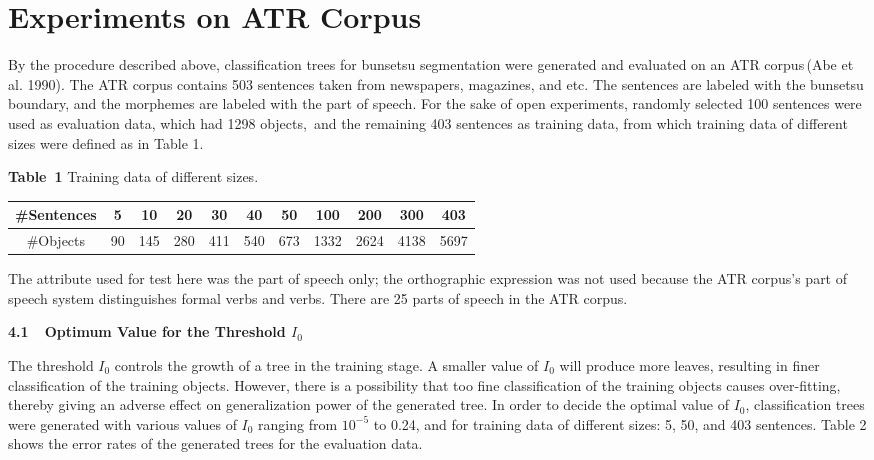 \section{Experiments on  ATR Corpus}
By the procedure described above, classification trees
for bunsetsu segmentation  were generated and  evaluated 
on an ATR corpus\,(Abe et al. 1990).
The ATR corpus contains 503 sentences taken from
newspapers, magazines, and etc. The sentences 
are  labeled with the bunsetsu boundary, and the morphemes are labeled with 
the part of speech.
For the sake  of open experiments,  randomly selected 100 sentences  were
used  as  evaluation data, which  had 1298 objects,\ and the remaining
403 sentences as  training data, from which training data of different sizes
 were  defined as in Table 1.
\begin{center}
{\bf Table\ 1} Training data of different sizes.
\vspace{10pt}\\
\begin{tabular}{c|c|c|c|c|c|c|c|c|c|c}
\#Sentences&5&10&20&30&40&50&100&200&300&403\\ \hline
\#Objects& 90 &145&280 &411   &540   &673   & 1332 &2624   &4138   &5697 
\end{tabular}
\end{center}
The attribute used for test here was the part of speech only; 
the orthographic expression
was not used because the ATR corpus's part of speech system
distinguishes formal verbs and verbs. There are 25 parts of speech in the ATR corpus.
\begin{flushleft}
{\large \bf 4.1\ \ Optimum Value for the Threshold  $I_0$ }
\end{flushleft}
  The threshold $I_0$ controls the growth of a tree in the training
stage.
A smaller value of $I_0$ will produce more leaves, resulting in 
finer classification of the training objects. However, there is a
possibility
that too fine classification of the training objects causes over-fitting,
thereby giving an adverse effect on generalization power  of the
generated tree.
In order to decide the optimal value of  $I_0$, classification trees
were generated with various values of $I_0$  ranging from $10^{-5}$ to 
0.24, and 
for training data of different sizes: 5, 50, and 403 
sentences.  Table 2  shows the error rates of the generated trees for 
  the evaluation data.
